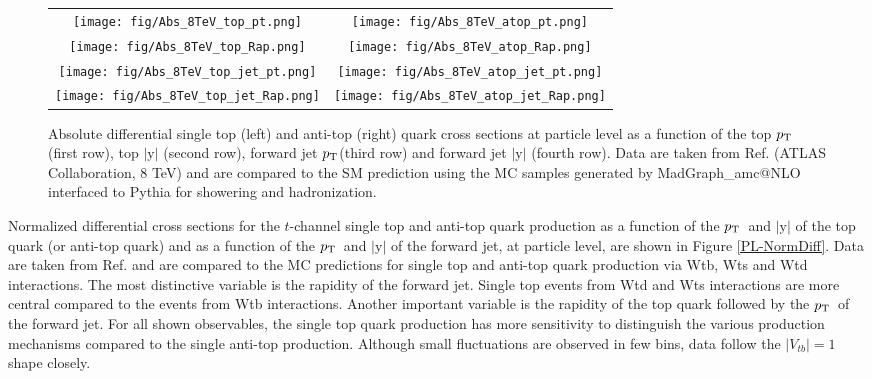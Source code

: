 \documentclass[11pt]{article}
\newcommand{\VTB}{|V_{tb}|}
\newcommand{\pt}{$p_{\rm T}$}
\begin{document}
\begin{figure}[!ht]
  \begin{center}
    \begin{tabular}{cc}
      \texttt{[image: fig/Abs\_8TeV\_top\_pt.png]}&
      \texttt{[image: fig/Abs\_8TeV\_atop\_pt.png]}\\
      \texttt{[image: fig/Abs\_8TeV\_top\_Rap.png]}&
      \texttt{[image: fig/Abs\_8TeV\_atop\_Rap.png]}\\
      \texttt{[image: fig/Abs\_8TeV\_top\_jet\_pt.png]}&
      \texttt{[image: fig/Abs\_8TeV\_atop\_jet\_pt.png]}\\
      \texttt{[image: fig/Abs\_8TeV\_top\_jet\_Rap.png]}&
      \texttt{[image: fig/Abs\_8TeV\_atop\_jet\_Rap.png]}\\
    \end{tabular}
    \caption{Absolute differential single top (left) and anti-top (right) quark cross sections at particle level as a function of the top \pt~ (first row), top $|\text{y}|$ (second row),  forward jet \pt (third row) and forward jet $|\text{y}|$ (fourth row). Data are taken from Ref. \cite{Aaboud:2017pdi} (ATLAS Collaboration, 8 TeV) and are compared to the SM prediction using the MC samples generated by  {\sc MadGraph\_}a{\sc mc@NLO}  interfaced to {\sc Pythia} for showering and hadronization.
    \vspace{10 mm}
    \label{PL-Diff}}
  \end{center}
\end{figure}



Normalized differential cross sections for the $t$-channel single top and anti-top quark production as a function of the \pt ~and $|\text{y}|$ of the top quark (or anti-top quark) and as a function of the  \pt ~and $|\text{y}|$ of the forward jet, at particle level, are shown in Figure \ref{PL-NormDiff}. Data are taken from Ref. \cite{Aaboud:2017pdi} and are compared to the MC predictions for single top and anti-top quark production via Wtb, Wts and Wtd interactions.
The most distinctive variable is the rapidity of the forward jet. Single top events from Wtd and Wts interactions are more central compared to the events from Wtb interactions.
Another important variable is the rapidity of the top quark followed by the \pt ~of the forward jet.
For all shown observables, the single top quark production has more sensitivity to distinguish the various production  mechanisms compared to the single anti-top production.
Although small fluctuations are observed in few bins, data follow the $\VTB = 1$ shape closely.
\end{document}
